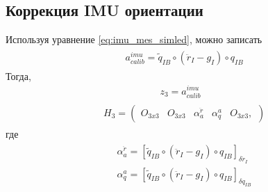 \documentclass[a4paper,12pt]{article}
\begin{document}
\subsection{Коррекция IMU ориентации}
Используя уравнение \eqref{eq:imu_mes_simled}, можно записать
\begin{align} 
\begin{split}
&a^{imu}_{calib}  = \tilde{q}_{IB} \circ (\ddot{r}_{I} - g_I) \circ q_{IB}
\end{split}
\end{align}
Тогда, 
\begin{align}
z_3 = a^{imu}_{calib}
\end{align}
\begin{align}
\begin{split}
&H_3 =
\begin{pmatrix}
O_{3x3} & O_{3x3} & \alpha^{\ddot{r}}_a & \alpha^a_q & O_{3x3},
\end{pmatrix}
\end{split}
\end{align}
где
\begin{align}
\begin{split}
&\alpha^{\ddot{r}}_a = [\tilde{q}_{IB} \circ (\ddot{r}_{I} - g_I) \circ q_{IB}]_{\delta \ddot{r}_I} \\
&\alpha^a_q = [\tilde{q}_{IB} \circ (\ddot{r}_{I} - g_I) \circ q_{IB}]_{\delta {q}_{IB}}
\end{split}
\end{align}
\end{document}
